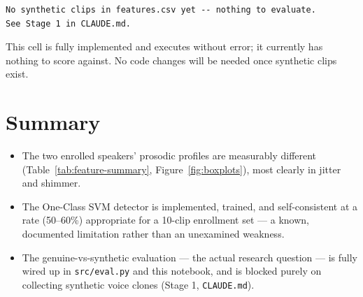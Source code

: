 \documentclass[11pt]{article}
\begin{document}
\begin{verbatim}
No synthetic clips in features.csv yet -- nothing to evaluate.
See Stage 1 in CLAUDE.md.
\end{verbatim}

This cell is fully implemented and executes without error; it currently
has nothing to score against. No code changes will be needed once
synthetic clips exist.

\section{Summary}

\begin{itemize}
  \item The two enrolled speakers' prosodic profiles are measurably
    different (Table~\ref{tab:feature-summary}, Figure~\ref{fig:boxplots}),
    most clearly in jitter and shimmer.
  \item The One-Class SVM detector is implemented, trained, and
    self-consistent at a rate (50--60\%) appropriate for a 10-clip
    enrollment set — a known, documented limitation rather than an
    unexamined weakness.
  \item The genuine-vs-synthetic evaluation — the actual research
    question — is fully wired up in \texttt{src/eval.py} and this
    notebook, and is blocked purely on collecting synthetic voice
    clones (Stage 1, \texttt{CLAUDE.md}).
\end{itemize}
\end{document}
